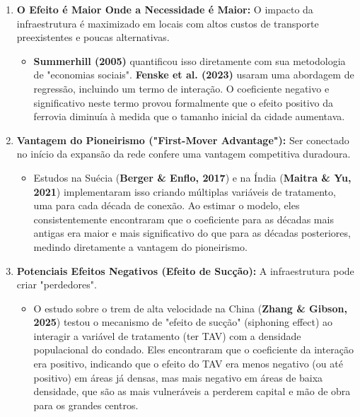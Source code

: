 \documentclass[12pt, a4paper]{article}
\begin{document}
\begin{enumerate}[label=\arabic*.]
    \item \textbf{O Efeito é Maior Onde a Necessidade é Maior:} O impacto da infraestrutura é maximizado em locais com altos custos de transporte preexistentes e poucas alternativas.
    
    \begin{itemize}
        \item \textbf{Summerhill (2005)} quantificou isso diretamente com sua metodologia de "economias sociais". 
        \textbf{Fenske et al. (2023)} usaram uma abordagem de regressão, incluindo um termo de interação. O coeficiente negativo e significativo neste termo provou formalmente que o efeito positivo da ferrovia diminuía à medida que o tamanho inicial da cidade aumentava.
    \end{itemize}

    \item \textbf{Vantagem do Pioneirismo ("First-Mover Advantage"):} Ser conectado no início da expansão da rede confere uma vantagem competitiva duradoura.
    
    \begin{itemize}
        \item  Estudos na Suécia (\textbf{Berger \& Enflo, 2017}) e na Índia (\textbf{Maitra \& Yu, 2021}) implementaram isso criando múltiplas variáveis de tratamento, uma para cada década de conexão. Ao estimar o modelo, eles consistentemente encontraram que o coeficiente para as décadas mais antigas era maior e mais significativo do que para as décadas posteriores, medindo diretamente a vantagem do pioneirismo.
    \end{itemize}

    \item \textbf{Potenciais Efeitos Negativos (Efeito de Sucção):} A infraestrutura pode criar "perdedores".
    
    \begin{itemize}
        \item  O estudo sobre o trem de alta velocidade na China (\textbf{Zhang \& Gibson, 2025}) testou o mecanismo de "efeito de sucção" (siphoning effect) ao interagir a variável de tratamento (ter TAV) com a densidade populacional do condado. Eles encontraram que o coeficiente da interação era positivo, indicando que o efeito do TAV era menos negativo (ou até positivo) em áreas já densas, mas mais negativo em áreas de baixa densidade, que são as mais vulneráveis a perderem capital e mão de obra para os grandes centros.
    \end{itemize}
    

\end{enumerate}
\end{document}
